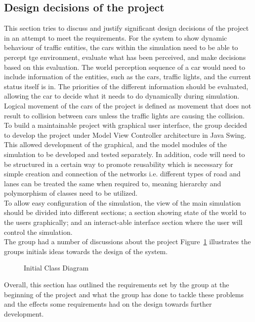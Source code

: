 \documentclass[11pt]{article}
\begin{document}
\subsection{Design decisions of the project}
This section tries to discuss and justify significant design decisions of the project in an attempt to meet the requirements.
For the system to show dynamic behaviour of traffic entities, the cars within the simulation need to be able to percept tge environment, evaluate what has been perceived, and make decisions based on this evaluation. The world perception sequence of a car would need to include information of the entities, such as the cars, traffic lights, and the current status itself is in. The priorities of the different information should be evaluated, allowing the car to decide what it needs to do dynamically during simulation. Logical movement of the cars of the project is defined as movement that does not result to collision between cars unless the traffic lights are causing the collision.
To build a maintainable project with graphical user interface, the group decided to develop the project under Model View Controller architecture in Java Swing. This allowed development of the graphical, and the model modules of the simulation to be developed and tested separately. In addition, code will need to be structured in a certain way to promote reusability which is necessary for simple creation and connection of the networks i.e. different types of road and lanes can be treated the same when required to, meaning hierarchy and polymorphism of classes need to be utilized.\\
To allow easy configuration of the simulation, the view of the main simulation should be divided into different sections; a section showing state of the world to the users graphically; and an interact-able interface section where the user will control the simulation. \\
The group had a number of discussions about the project Figure~\ref{fig:InitialClassDiagram} illustrates the groups initials ideas towards the design of the system.
\begin{center}
\begin{figure}[!htb]
		\setlength{\fboxsep}{0pt}%
\setlength{\fboxrule}{1pt}%
	\caption{Initial Class Diagram}
	\label{fig:InitialClassDiagram}
\end{figure}
\end{center}

Overall, this section has outlined the requirements set by the group at the beginning of the project and what the group has done to tackle these problems and the effects some requirements had on the design towards further development. 
 
\end{document}
